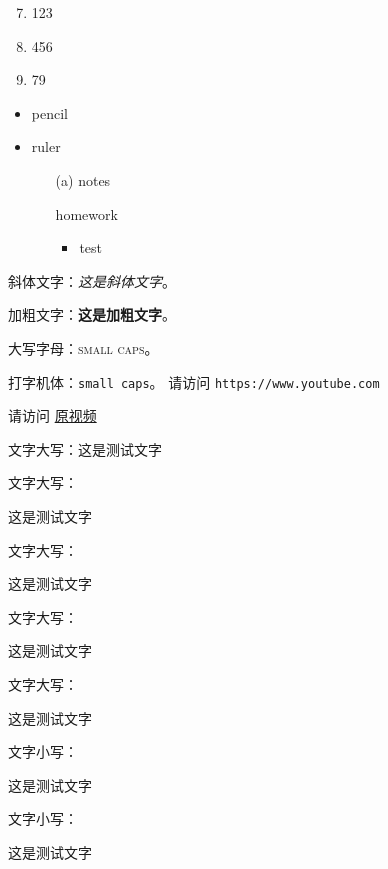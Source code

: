 \documentclass[10pt, a4paper]{article}
\begin{document}
\begin{enumerate} \setcounter{enumi}{6}
    \item 123
    \item 456
    \item 79
\end{enumerate}

\vspace{1cm}

\begin{itemize}
    \item pencil
    \item ruler
    \begin{itemize}
        \item[(a)] notes
        \item[] homework
        \begin{itemize}
            \item test
        \end{itemize}
    \end{itemize}
\end{itemize}

斜体文字：\textit{这是斜体文字}。

加粗文字：\textbf{这是加粗文字}。

大写字母：\textsc{small caps}。

打字机体：\texttt{small caps}。
请访问 \texttt{https://www.youtube.com}

请访问 \href{https://www.youtube.com/watch?v=ydOTMQC7np0&t=6701s&ab_channel=freeCodeCamp.org}{原视频}

文字大写：这是测试文字

文字大写：\begin{large}这是测试文字\end{large}

文字大写：\begin{Large}这是测试文字\end{Large}

文字大写：\begin{LARGE}这是测试文字\end{LARGE}

文字大写：\begin{huge}这是测试文字\end{huge}

文字小写：\begin{small}这是测试文字\end{small}

文字小写：\begin{scriptsize}这是测试文字\end{scriptsize}
\end{document}
